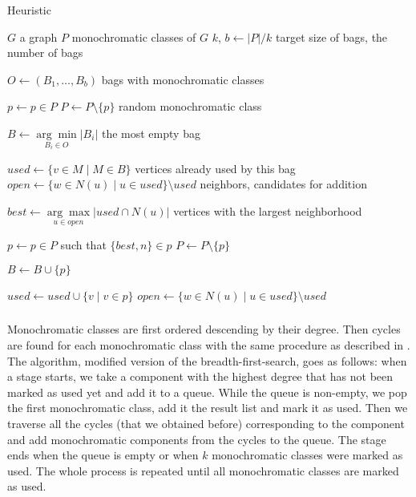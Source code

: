 \begin{algorithm}
	\caption{Heuristic \Neighbors}%
	\label{alg:neighbors}
	\begin{algorithmic}[1]

		\Require{} $G$
		\Comment{} a graph
		\Require{} $P$
		\Comment{} monochromatic classes of $G$
		\Require{} $k$, $b \gets |P|/k$
		\Comment{} target size of bags, the number of bags

		\Ensure{} $O \gets (B_1, \ldots, B_b)$
		\Comment{} bags with monochromatic classes

		\State{} $p \gets p \in P$
		\State{} $P \gets P \setminus \{p\}$
		\Comment{} random monochromatic class

		\State{} $B \gets \underset{B_i \in O}{\arg\min} |B_i|$
		\Comment{} the most empty bag

		\State{} $used \gets \{{v \in M} \mid {M \in B } \}$
		\Comment{} vertices already used by this bag
		\State{} $open \gets  \{w \in N(u) \mid u \in used\} \setminus used $
		\Comment{} neighbors, candidates for addition


		\State{} $best \gets \underset{u \in open}{\arg\max}|used \cap N(u)|$
		\Comment{} vertices with the largest neighborhood

		\State{} $p \gets p \in P$ such that $\{best, n\} \in p$
		\State{} $P \gets P \setminus \{p\}$

		\State{} $B \gets B \cup \{p\}$

		\State{} $used \gets used \cup \{v \mid {v \in p} \}$
		\State{} $open \gets  \{w \in N(u) \mid u \in used\} \setminus used $
		\EndFor{}
		\EndWhile{}
		\EndWhile{}
	\end{algorithmic}
\end{algorithm}

\subsubsection{\CyclesMatchChunks{}}

Monochromatic classes are first ordered descending by their degree.
Then cycles are found for each monochromatic class with the same procedure
as described in .
The algorithm, modified version of the breadth-first-search, goes as follows:
when a stage starts, we take a component with the highest degree
that has not been marked as used yet and add it to a queue.
While the queue is non-empty, we pop the first monochromatic class,
add it the result list and mark it as used.
Then we traverse all the cycles (that we obtained before)
corresponding to the component
and add monochromatic components from the cycles to the queue.
The stage ends when the queue is empty or when \( k \) monochromatic classes
were marked as used. The whole process is repeated until
all monochromatic classes are marked as used.

